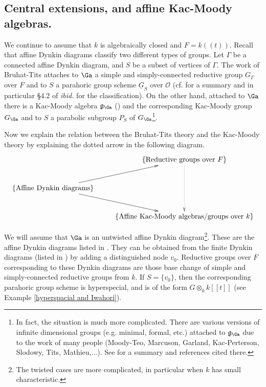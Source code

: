 \documentclass[]{pcmi}
\theoremstyle{plain}
\theoremstyle{remark}
\theoremstyle{definition}
\newcommand{\frakg}{{\mathfrak g}}
\newcommand{\mO}{{\mathcal O}}
\begin{document}
\subsection{Central extensions, and affine Kac-Moody algebras.}\label{Kac-Moody}
We continue to assume that $k$ is algebraically closed and $F=k((t))$.
Recall that affine Dynkin diagrams classify two different types of groups.
Let $\Gamma$ be a connected affine Dynkin diagram, and $S$ be a subset of vertices of $\Gamma$. The work of Bruhat-Tits attaches to $\Ga$ a simple and simply-connected reductive group $G_\Gamma$ over $F$ and to $S$ a parahoric group scheme $\underline G_S$ over $\mO$ (cf. \cite{Ti} for a summary and in particular \S 4.2 of \emph{ibid.} for the classification). On the other hand, attached to $\Ga$ there is a Kac-Moody algebra $\frakg_\Ga$ (\cite[Chap. 4]{Kac}) and the corresponding Kac-Moody group $G_{\Ga}$ and to $S$ a parabolic subgroup $P_S$ of $G_{\Ga}$\footnote{In fact, the situation is much more complicated. There are various versions of infinite dimensional groups (e.g. minimal, formal, etc.)  attached to $\frakg_\Ga$ due to the work of many people (Moody-Teo, Marcuson, Garland, Kac-Perterson, Slodowy, Tits, Mathieu,...). See \cite{Ti3} for a summary and references cited there.}.

Now we explain the relation between the Bruhat-Tits theory and the Kac-Moody theory by explaining the dotted arrow in the following diagram.
\[\xymatrix{
&\left\{\textrm{Reductive groups over } F\right\}\ar@{.>}[dd]\\
\left\{\textrm{Affine Dynkin diagrams}\right\} \ar[ur]\ar[dr]&\\
&\left\{\textrm{Affine Kac-Moody algebras/groups over } k\right\}
}\]

We will assume that $\Ga$ is an untwisted affine Dynkin diagram\footnote{The twisted cases are more complicated, in particular when $k$ has small characteristic.}. These are the affine Dynkin diagrams listed in \cite[Chap. 4, TABLE Aff 1]{Kac}. They can be obtained from the finite Dynkin diagrams (listed in \cite[Chap 4, TABLE Fin]{Kac}) by adding a distinguished node $v_0$. Reductive groups over $F$ corresponding to these Dynkin diagrams are those base change of simple and simply-connected reductive groups from $k$. If $S=\{v_0\}$, then the corresponding parahoric group scheme is hyperspecial, and is of the form $G\otimes_kk[[t]]$ (see Example \ref{hyperspacial and Iwahori}).
\end{document}
